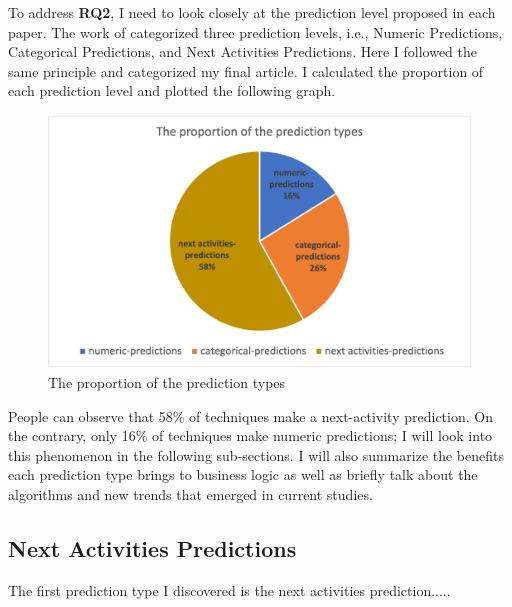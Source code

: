 \documentclass[runningheads]{llncs}
\begin{document}
		To address \textbf{RQ2}, I need to look closely at the prediction level proposed in each paper. The work of \cite{original} categorized three prediction levels, i.e., Numeric Predictions,   Categorical Predictions, and Next Activities Predictions. Here I followed the same principle and categorized my final article. I calculated the proportion of each prediction level and plotted the following graph.
		
		
		\begin{figure}
		\includegraphics[scale=0.5]{proportion_prediction.png}
		\centering
		\caption{The proportion of the prediction types}
		\end{figure}
		
		People can observe that 58\% of techniques make a next-activity prediction. On the contrary, only 16\% of techniques make numeric predictions; I will look into this phenomenon in the following sub-sections. I will also summarize the benefits each prediction type brings to business logic as well as briefly talk about the algorithms and new trends that emerged in current studies.
		
		\subsection{Next Activities Predictions}
		The first prediction type I discovered is the next activities prediction.....
		
		
		
		
		
		
		
		
		
		
		
		
		
		
		
		
		
\end{document}
